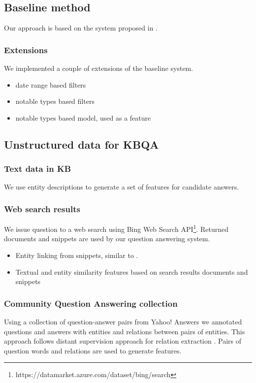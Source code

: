 
\subsection{Baseline method}
Our approach is based on the system proposed in \cite{ACCU:2015}.

\subsubsection{Extensions}
We implemented a couple of extensions of the baseline system.

\begin{itemize}
\item date range based filters
\item notable types based filters
\item notable types based model, used as a feature
\end{itemize}

\subsection{Unstructured data for KBQA}

\subsubsection{Text data in KB}
We use entity descriptions to generate a set of features for candidate answers.

\subsubsection{Web search results}
We issue question to a web search using Bing Web Search API\footnote{https://datamarket.azure.com/dataset/bing/search}.
Returned documents and snippets are used by our question answering system.

\begin{itemize}
\item Entity linking from snippets, similar to \cite{SMAPH_ERD:2014}.
\item Textual and entity similarity features based on search results documents and snippets
\end{itemize}

\subsubsection{Community Question Answering collection}
Using a collection of question-answer pairs from Yahoo! Answers we annotated questions and answers with entities and relations between pairs of entities.
This approach follows distant supervision approach for relation extraction \cite{savenkov-EtAl:2015:SRW}.
Pairs of question words and relations are used to generate features.

